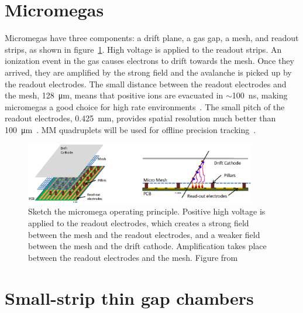 

\section{Micromegas}

Micromegas have three components: a drift plane, a gas gap, a mesh, and readout strips, as shown in figure~\ref{fig:micromega}. High voltage is applied to the readout strips. An ionization event in the gas causes electrons to drift towards the mesh. Once they arrived, they are amplified by the strong field and the avalanche is picked up by the readout electrodes. The small distance between the readout electrodes and the mesh, \SI{128}{\micro\meter}, means that positive ions are evacuated in $\sim$\SI{100}{\nano\second}, making micromegas a good choice for high rate environments~\cite{nsw_tdr}. The small pitch of the readout electrodes, \SI{0.425}{mm}, provides spatial resolution much better than \SI{100}{\micro\meter}~\cite{stelzer_new_2016}. MM quadruplets will be used for offline precision tracking~\cite{nsw_tdr}.

\begin{figure}
    \centering
    \includegraphics[width = 0.9\textwidth]{figures/micromegas.png}
    \caption{Sketch the micromega operating principle. Positive high voltage is applied to the readout electrodes, which creates a strong field between the mesh and the readout electrodes, and a weaker field between the mesh and the drift cathode. Amplification takes place between the readout electrodes and the mesh. Figure from~\cite{nsw_tdr}}
    \label{fig:micromega}
\end{figure}

\section{Small-strip thin gap chambers}

